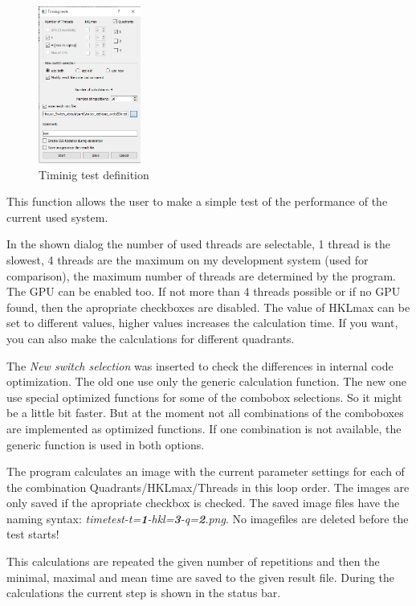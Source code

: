 \documentclass[11pt]{article} %
\begin{document}
\begin{figure}
  \begin{center}
    \includegraphics[width=0.3\textwidth]{timing_test.png}
  \end{center}
 \caption{Timinig test definition}
\end{figure}

This function allows the user to make a simple test of the performance of the current used system.

In the shown dialog the number of used threads are selectable, 1 thread is the slowest, 4 threads are the maximum on my development system (used for comparison), the maximum number of threads are determined by the program. The GPU can be enabled too. If not more than 4 threads possible or if no GPU found, then the apropriate checkboxes are disabled. The value of HKLmax can be set to different values, higher values increases the calculation time. If you want, you can also make the calculations for different quadrants.

The {\it New switch selection} was inserted to check the differences in internal code optimization. The old one use only the generic calculation function. The new one use special optimized functions for some of the combobox selections. So it might be a little bit faster. But at the moment not all combinations of the comboboxes are implemented as optimized functions. If one combination is not available, the generic function is used in both options.

The program calculates an image with the current parameter settings for each of the combination Quadrants/HKLmax/Threads in this loop order. The images are only saved if the apropriate checkbox is checked. The saved image files have the naming syntax: {\it timetest-t={\bf 1}-hkl={\bf 3}-q={\bf 2}.png}. No imagefiles are deleted before the test starts!

This calculations are repeated the given number of repetitions and then the minimal, maximal and mean time are saved to the given result file. During the calculations the current step is shown in the status bar.
\end{document}
